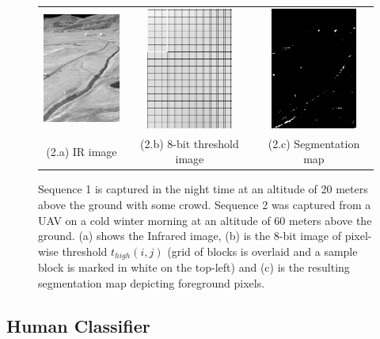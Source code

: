 \documentclass[runningheads]{llncs}
\begin{document}
\begin{figure}
  \begin{tabular}{ccc}
    \includegraphics[height=4cm]{img/bg_sub/Roth_Infrared_Image_screenshot.png} &
    \includegraphics[height=4cm]{img/bg_sub/Roth_Threshold_values(high)_screenshot.png} &
    \includegraphics[height=4cm]{img/bg_sub/Roth_Segmentation_Map_screenshot.png} \\
    \small (2.a) IR image & 
    \small (2.b) 8-bit threshold image &
    \small (2.c) Segmentation map
  \end{tabular}

  \caption{Sequence 1 is captured in the night time at an altitude of 20 meters above the ground with some crowd. Sequence 2 was captured from a UAV on a cold winter morning at an altitude of 60 meters above the ground. (a) shows the Infrared image, (b) is the 8-bit image of pixel-wise threshold $t_{high}(i, j)$  (grid of blocks is overlaid and a sample block is marked in white on the top-left) and (c) is the resulting segmentation map depicting foreground pixels.}\label{fig:bg_sub}
\end{figure}


\subsection{Human Classifier}
\end{document}
